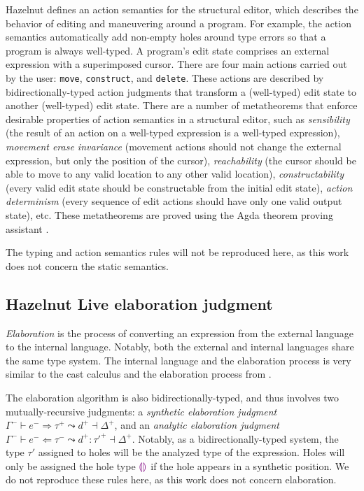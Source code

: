 Hazelnut defines an action semantics for the structural editor, which describes the behavior of editing and maneuvering around a program. For example, the action semantics automatically add non-empty holes around type errors so that a program is always well-typed. A program's edit state comprises an external expression with a superimposed cursor. There are four main actions carried out by the user: \texttt{move}, \texttt{construct}, and \texttt{delete}. These actions are described by bidirectionally-typed action judgments that transform a (well-typed) edit state to another (well-typed) edit state. There are a number of metatheorems that enforce desirable properties of action semantics in a structural editor, such as \textit{sensibility} (the result of an action on a well-typed expression is a well-typed expression), \textit{movement erase invariance} (movement actions should not change the external expression, but only the position of the cursor), \textit{reachability} (the cursor should be able to move to any valid location to any other valid location), \textit{constructability} (every valid edit state should be constructable from the initial edit state), \textit{action determinism} (every sequence of edit actions should have only one valid output state), etc. These metatheorems are proved using the Agda theorem proving assistant \cite{agda2017}.

The typing and action semantics rules will not be reproduced here, as this work does not concern the static semantics.

\subsection{Hazelnut Live elaboration judgment}
\label{sec:hazel-elaboration}

\textit{Elaboration} is the process of converting an expression from the external language to the internal language. Notably, both the external and internal languages share the same type system. The internal language and the elaboration process is very similar to the cast calculus \gtclc{} and the elaboration process from \gtlc{}.

The elaboration algorithm is also bidirectionally-typed, and thus involves two mutually-recursive judgments: a \textit{synthetic elaboration judgment} $\Gamma^-\vdash e^-\Rightarrow\tau^+\leadsto d^+\dashv\Delta^+$, and an \textit{analytic elaboration judgment} $\Gamma^-\vdash e^-\Leftarrow\tau^-\leadsto d^+:\tau'^+\dashv\Delta^+$. Notably, as a bidirectionally-typed system, the type $\tau'$ assigned to holes will be the analyzed type of the expression. Holes will only be assigned the hole type $\textcolor{violet}{\llparenthesis}\textcolor{violet}{\rrparenthesis}$ if the hole appears in a synthetic position. We do not reproduce these rules here, as this work does not concern elaboration.

